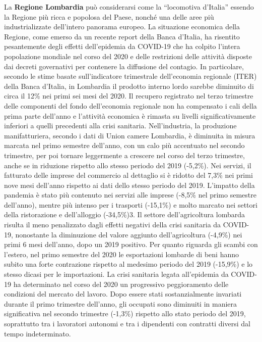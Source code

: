 \documentclass[
  12pt,
]{article}
\begin{document}
La \textbf{Regione Lombardia} può considerarsi come la ``locomotiva
d'Italia'' essendo la Regione più ricca e popolosa del Paese, nonché una
delle aree più industrializzate dell'intero panorama europeo. La
situazione economica della Regione, come emerso da un recente report
della Banca d'Italia, ha risentito pesantemente degli effetti
dell'epidemia da COVID-19 che ha colpito l'intera popolazione mondiale
nel corso del 2020 e delle restrizioni delle attività disposte dai
decreti governativi per contenere la diffusione del contagio. In
particolare, secondo le stime basate sull'indicatore trimestrale
dell'economia regionale (ITER) della Banca d'Italia, in Lombardia il
prodotto interno lordo sarebbe diminuito di circa il 12\% nei primi sei
mesi del 2020. Il recupero registrato nel terzo trimestre delle
componenti del fondo dell'economia regionale non ha compensato i cali
della prima parte dell'anno e l'attività economica è rimasta su livelli
significativamente inferiori a quelli precedenti alla crisi sanitaria.
Nell'industria, la produzione manifatturiera, secondo i dati di Union
camere Lombardia, è diminuita in misura marcata nel primo semestre
dell'anno, con un calo più accentuato nel secondo trimestre, per poi
tornare leggermente a crescere nel corso del terzo trimestre, anche se
in riduzione rispetto allo stesso periodo del 2019 (-5,2\%). Nei
servizi, il fatturato delle imprese del commercio al dettaglio si è
ridotto del 7,3\% nei primi nove mesi dell'anno rispetto ai dati dello
stesso periodo del 2019. L'impatto della pandemia è stato più contenuto
nei servizi alle imprese (-8,5\% nel primo semestre dell'anno), mentre
più intenso per i trasporti (-15,1\%) e molto marcato nei settori della
ristorazione e dell'alloggio (-34,5\%)3. Il settore dell'agricoltura
lombarda risulta il meno penalizzato dagli effetti negativi della crisi
sanitaria da COVID-19, nonostante la diminuzione del valore aggiunto
dell'agricoltura (-4,9\%) nei primi 6 mesi dell'anno, dopo un 2019
positivo. Per quanto riguarda gli scambi con l'estero, nel primo
semestre del 2020 le esportazioni lombarde di beni hanno subito una
forte contrazione rispetto al medesimo periodo del 2019 (-15,9\%) e lo
stesso dicasi per le importazioni. La crisi sanitaria legata
all'epidemia da COVID-19 ha determinato nel corso del 2020 un
progressivo peggioramento delle condizioni del mercato del lavoro. Dopo
essere stati sostanzialmente invariati durante il primo trimestre
dell'anno, gli occupati sono diminuiti in maniera significativa nel
secondo trimestre (-1,3\%) rispetto allo stato periodo del 2019,
soprattutto tra i lavoratori autonomi e tra i dipendenti con contratti
diversi dal tempo indeterminato.
\end{document}
